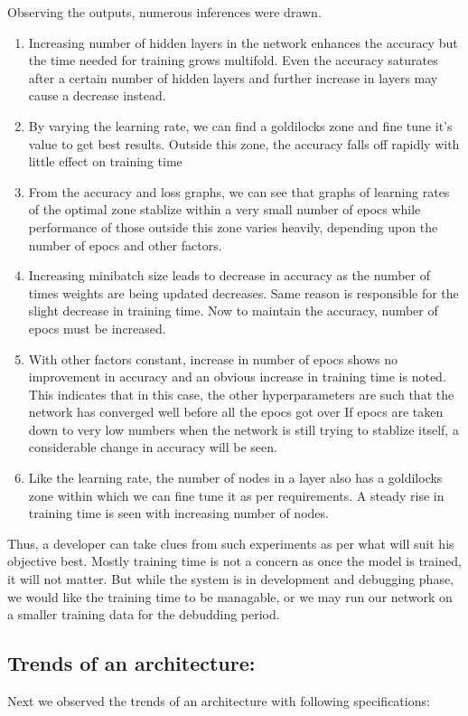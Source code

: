 \documentclass[conference]{IEEEtran}
\begin{document}
Observing the outputs, numerous inferences were drawn.
\begin{enumerate}
\item Increasing number of hidden layers in the network enhances the accuracy but the time needed for training grows multifold. Even the accuracy saturates after a certain number of hidden layers and further increase in layers may cause a decrease instead.
\item By varying the learning rate, we can find a goldilocks zone and fine tune it's value to get best results. Outside this zone, the accuracy falls off rapidly with little effect on training time
\item From the accuracy and loss graphs, we can see that graphs of learning rates of the optimal zone stablize within a very small number of epocs while performance of those outside this zone varies heavily, depending upon the number of epocs and other factors.
\item Increasing minibatch size leads to decrease in accuracy as the number of times weights are being updated decreases. Same reason is responsible for the slight decrease in training time. Now to maintain the accuracy, number of epocs must be increased.
\item With other factors constant, increase in number of epocs shows no improvement in accuracy and an obvious increase in training time is noted. This indicates that in this case, the other hyperparameters are such that the network has converged well before all the epocs got over If epocs are taken down to very low numbers when the network is still trying to stablize itself, a considerable change in accuracy will be seen.
\item Like the learning rate, the number of nodes in a layer also has a goldilocks zone within which we can fine tune it as per requirements. A steady rise in training time is seen with increasing number of nodes.
\end{enumerate}

Thus, a developer can take clues from such experiments as per what will suit his objective best. Mostly training time is not a concern as once the model is trained, it will not matter. But while the system is in development and debugging phase, we would like the training time to be managable, or we may run our network on a smaller training data for the debudding period.
\subsection{Trends of an architecture:}
Next we observed the trends of an architecture with following specifications:
\end{document}
